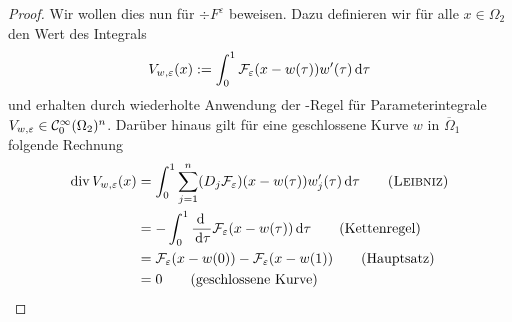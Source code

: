 \begin{proof}
  Wir wollen dies nun für $\div F^\varepsilon$ beweisen.
  Dazu definieren wir für alle $x\in\Omega_2$ den Wert des Integrals
  $$
  V_{w,\varepsilon}(x) := \int_0^1 \mathcal{F}_\varepsilon(x - w(\tau))w'(\tau)\, {\operatorname{d}\!{\tau}}
  $$
  und erhalten durch wiederholte Anwendung der \leibniz\hyp{}Regel für Parameterintegrale $ V_{w,\varepsilon} \in \mathcal{C}_0^\infty(\Omega_2)^n$.
  Darüber hinaus gilt für eine geschlossene Kurve $w$ in $\overline\Omega_1$ folgende Rechnung
  \begingroup
  \addtolength{\jot}{0.5em}
  \begin{align*}
    \div V_{w,\varepsilon}(x) 
    &= \int_0^1 \sum_{j=1}^n (D_j \mathcal{F}_\varepsilon)(x - w(\tau))w_j'(\tau) \d\tau \tag{\leibniz}\\
    &= -\int_0^1 \frac{\d\ }{\d\tau}\mathcal{F}_\varepsilon(x - w(\tau)) \d\tau \tag{Kettenregel}\\
    &= \mathcal{F}_\varepsilon(x - w(0)) - \mathcal{F}_\varepsilon(x - w(1)) \tag{Hauptsatz}\\
    &= 0 \tag{geschlossene Kurve}
  \end{align*}
  \endgroup


\end{proof}
